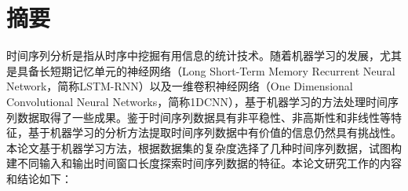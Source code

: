 \setlength{\headheight}{26pt}
\maketitle %
\MAKETITLE %
\makedeclaration %

\intobmk\chapter*{\texorpdfstring{摘\quad 要}{摘要}}
\setcounter{page}{1}
时间序列分析是指从时序中挖掘有用信息的统计技术。随着机器学习的发展，尤其是具备长短期记忆单元的神经网络（Long Short-Term Memory Recurrent Neural Network，简称LSTM-RNN）以及一维卷积神经网络（One Dimensional Convolutional Neural Networks，简称1DCNN），基于机器学习的方法处理时间序列数据取得了一些成果。鉴于时间序列数据具有非平稳性、非高斯性和非线性等特征，基于机器学习的分析方法提取时间序列数据中有价值的信息仍然具有挑战性。本论文基于机器学习方法，根据数据集的复杂度选择了几种时间序列数据，试图构建不同输入和输出时间窗口长度探索时间序列数据的特征。本论文研究工作的内容和结论如下：
